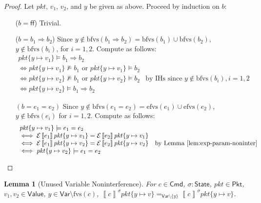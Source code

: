 \documentclass{article}
\newcommand{\pkt}{\mathit{pkt}}
\newcommand{\denote}[1]{\left\llbracket#1\right\rrbracket}
\newcommand{\edenote}[1]{\mathcal{E}\denote{#1}}
\newcommand{\FALSE}{\mathsf{ff}}
\newcommand{\Value}{\mathsf{Value}}
\newcommand{\Cmd}{\mathsf{Cmd}}
\newcommand{\Pkt}{\mathsf{Pkt}}
\newcommand{\Var}{\mathsf{Var}}
\newcommand{\State}{\mathsf{State}}
\newcommand{\fvs}{\textrm{fvs}}
\newcommand{\efvs}{\textrm{efvs}}
\newcommand{\bfvs}{\textrm{bfvs}}
\theoremstyle{plain}
\newtheorem{lemma}{Lemma}
\theoremstyle{definition}
\theoremstyle{remark}
\begin{document}
\begin{proof}
  Let $\pkt$, $v_1$, $v_2$, and $y$ be given as above.
  Proceed by induction on $b$:
  \begin{enumerate}[align=left]
  \item[($b = \FALSE$)] Trivial.
  \item[($b = b_1 \Rightarrow b_2$)] Since $y \not \in\bfvs(b_1 \Rightarrow b_2) =
    \bfvs(b_1) \cup \bfvs(b_2)$, $y \not \in \bfvs(b_i)$, for $i = 1,2$. Compute
    as follows:
    \[\begin{array}{ll}
    \pkt\{y \mapsto v_1\} \models b_1 \Rightarrow b_2 \\
    \iff \pkt\{y \mapsto v_1\} \not\models b_1 \text{ or } \pkt\{y \mapsto v_1\} \models b_2 \\
    \iff \pkt\{y \mapsto v_2\} \not\models b_1 \text{ or } \pkt\{y \mapsto v_2\} \models b_2
    & \text{by IHs since } y \not \in \bfvs(b_i), i = 1,2 \\
    \iff \pkt\{y \mapsto v_2\} \models b_1 \Rightarrow b_2
    \end{array}\]

  \item[$(b = e_1 = e_2)$] Since $y \not \in\bfvs(e_1 = e_2) = \efvs(e_1) \cup
    \efvs(e_2)$, $y \not \in \bfvs(e_i)$ for $i =1,2$. Compute as follows:
    \[\begin{array}{ll}
    \pkt\{y \mapsto v_1\} \models e_1 = e_2 \\
    \iff \edenote{e_1}\pkt\{y \mapsto v_1\} = \edenote{e_2}\pkt\{y \mapsto v_1\} \\
    \iff\edenote{e_1}\pkt\{y \mapsto v_2\} = \edenote{e_2}\pkt\{y \mapsto v_2\} & \text{by Lemma~\ref{lem:exp-param-noninter}} \\
    \iff \pkt\{y\mapsto v_2\} \models e_1 = e_2
    \end{array}
    \]
  \end{enumerate}
\end{proof}

\begin{lemma}[Unused Variable Noninterference]
  \label{lem:param-noninter}
  For $c \in \Cmd$, $\sigma : \State$, $\pkt \in \Pkt$,
  $v_1,v_2 \in \Value$, $y \in \Var \setminus \fvs(c)$,
  $\denote{c}^\sigma \pkt\{y \mapsto v\} =_{\Var \setminus \{y\}}\denote{c}^\sigma\pkt\{y \mapsto v\}$.
\end{lemma}
\end{document}
